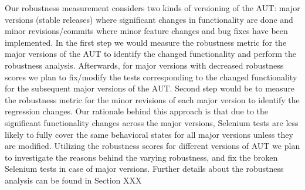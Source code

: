 Our robustness measurement considers two kinds of versioning of the AUT: major versions (stable releases) where significant changes in functionality are done and minor revisions/commits where minor feature changes and bug fixes have been implemented.  In the first step we would measure the robustness metric for the major versions of the AUT to identify the changed functionality and perform the robustness analysis. Afterwards, for major versions with decreased robustness scores we plan to fix/modify the tests corresponding to the changed functionality for the subsequent major versions of the AUT. Second step would be to measure the robustness metric for the minor revisions of each major version to identify the regression changes. Our rationale behind this approach is that due to the significant functionality changes across the major versions, Selenium tests are less likely to fully cover the same behavioral states for all major versions unless they are modified. Utilizing the robustness scores for different versions of AUT we plan to investigate the reasons behind the varying robustness, and fix the broken Selenium tests in case of major versions. Further details about the robustness analysis  can be found in Section XXX